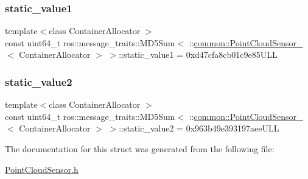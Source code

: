 \subsubsection{\texorpdfstring{static\+\_\+value1}{static\_value1}}
{\footnotesize\ttfamily template$<$class Container\+Allocator $>$ \\
const uint64\+\_\+t ros\+::message\+\_\+traits\+::\+M\+D5\+Sum$<$ \+::\hyperlink{structcommon_1_1PointCloudSensor__}{common\+::\+Point\+Cloud\+Sensor\+\_\+}$<$ Container\+Allocator $>$ $>$\+::static\+\_\+value1 = 0xd47cfa8cb01c9e85\+U\+LL\hspace{0.3cm}{\ttfamily [static]}}

\mbox{\label{structros_1_1message__traits_1_1MD5Sum_3_01_1_1common_1_1PointCloudSensor___3_01ContainerAllocator_01_4_01_4_ae4d8d8d225afd347ea80d9fa82f7064d}} 
\subsubsection{\texorpdfstring{static\+\_\+value2}{static\_value2}}
{\footnotesize\ttfamily template$<$class Container\+Allocator $>$ \\
const uint64\+\_\+t ros\+::message\+\_\+traits\+::\+M\+D5\+Sum$<$ \+::\hyperlink{structcommon_1_1PointCloudSensor__}{common\+::\+Point\+Cloud\+Sensor\+\_\+}$<$ Container\+Allocator $>$ $>$\+::static\+\_\+value2 = 0x963b49e393197aee\+U\+LL\hspace{0.3cm}{\ttfamily [static]}}



The documentation for this struct was generated from the following file\+:\begin{DoxyCompactItemize}
\item 
\hyperlink{PointCloudSensor_8h}{Point\+Cloud\+Sensor.\+h}\end{DoxyCompactItemize}
